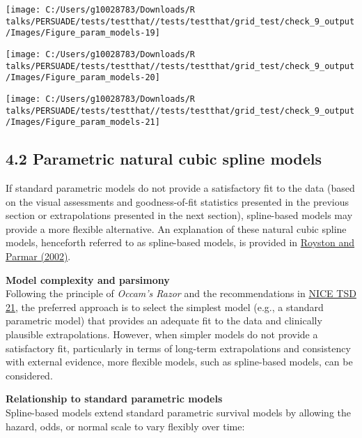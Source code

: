 \documentclass[
]{article}
\begin{document}
\begin{flushleft}\texttt{[image: C:/Users/g10028783/Downloads/R talks/PERSUADE/tests/testthat//tests/testthat/grid\_test/check\_9\_output/Images/Figure\_param\_models-19]} \end{flushleft}

\begin{flushleft}\texttt{[image: C:/Users/g10028783/Downloads/R talks/PERSUADE/tests/testthat//tests/testthat/grid\_test/check\_9\_output/Images/Figure\_param\_models-20]} \end{flushleft}

\begin{flushleft}\texttt{[image: C:/Users/g10028783/Downloads/R talks/PERSUADE/tests/testthat//tests/testthat/grid\_test/check\_9\_output/Images/Figure\_param\_models-21]} \end{flushleft}

\clearpage

\subsection{4.2 Parametric natural cubic spline
models}\label{parametric-natural-cubic-spline-models}

If standard parametric models do not provide a satisfactory fit to the
data (based on the visual assessments and goodness-of-fit statistics
presented in the previous section or extrapolations presented in the
next section), spline-based models may provide a more flexible
alternative. An explanation of these natural cubic spline models,
henceforth referred to as spline-based models, is provided in
\href{https://doi.org/10.1002/sim.1203}{Royston and Parmar (2002)}.

\textbf{Model complexity and parsimony}\\
Following the principle of \emph{Occam's Razor} and the recommendations
in
\href{https://www.sheffield.ac.uk/media/34188/download?attachment}{NICE
TSD 21}, the preferred approach is to select the simplest model (e.g., a
standard parametric model) that provides an adequate fit to the data and
clinically plausible extrapolations. However, when simpler models do not
provide a satisfactory fit, particularly in terms of long-term
extrapolations and consistency with external evidence, more flexible
models, such as spline-based models, can be considered.

\textbf{Relationship to standard parametric models}\\
Spline-based models extend standard parametric survival models by
allowing the hazard, odds, or normal scale to vary flexibly over time:
\end{document}
